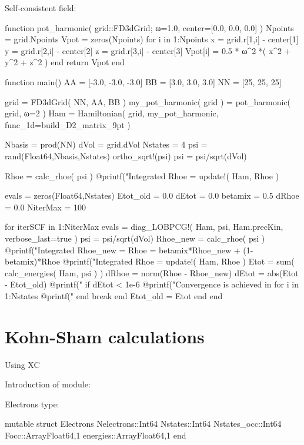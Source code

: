 Self-consistent field:
\begin{juliacode}
function pot_harmonic( grid::FD3dGrid; ω=1.0, center=[0.0, 0.0, 0.0] )
  Npoints = grid.Npoints
  Vpot = zeros(Npoints)
  for i in 1:Npoints
    x = grid.r[1,i] - center[1]
    y = grid.r[2,i] - center[2]
    z = grid.r[3,i] - center[3]
    Vpot[i] = 0.5 * ω^2 *( x^2 + y^2 + z^2 )
  end
  return Vpot
end

function main()
  AA = [-3.0, -3.0, -3.0]
  BB = [3.0, 3.0, 3.0]
  NN = [25, 25, 25]

  grid = FD3dGrid( NN, AA, BB )
  my_pot_harmonic( grid ) = pot_harmonic( grid, ω=2 )
  Ham = Hamiltonian( grid, my_pot_harmonic, func_1d=build_D2_matrix_9pt )

  Nbasis = prod(NN)
  dVol = grid.dVol
  Nstates = 4
  psi = rand(Float64,Nbasis,Nstates)
  ortho_sqrt!(psi)
  psi = psi/sqrt(dVol)

  Rhoe = calc_rhoe( psi )
  @printf("Integrated Rhoe = %
  update!( Ham, Rhoe )

  evals = zeros(Float64,Nstates)
  Etot_old = 0.0
  dEtot = 0.0
  betamix = 0.5
  dRhoe = 0.0
  NiterMax = 100

  for iterSCF in 1:NiterMax
    evals = diag_LOBPCG!( Ham, psi, Ham.precKin, verbose_last=true )
    psi = psi/sqrt(dVol)
    Rhoe_new = calc_rhoe( psi )
    @printf("Integrated Rhoe_new = %
    Rhoe = betamix*Rhoe_new + (1-betamix)*Rhoe
    @printf("Integrated Rhoe     = %
    update!( Ham, Rhoe )
    Etot = sum( calc_energies( Ham, psi ) )
    dRhoe = norm(Rhoe - Rhoe_new)
    dEtot = abs(Etot - Etot_old)
    @printf("%
    if dEtot < 1e-6
      @printf("Convergence is achieved in %
      for i in 1:Nstates
        @printf("%
      end
      break
    end
    Etot_old = Etot
  end
end
\end{juliacode}

\section{Kohn-Sham calculations}

Using XC

Introduction of module:

Electrons type:
\begin{juliacode}
mutable struct Electrons
  Nelectrons::Int64
  Nstates::Int64
  Nstates_occ::Int64
  Focc::Array{Float64,1}
  energies::Array{Float64,1}
end
\end{juliacode}

